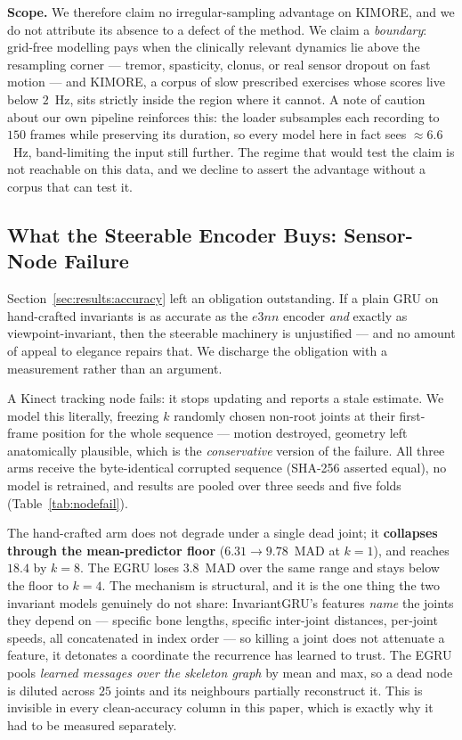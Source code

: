 \textbf{Scope.} We therefore claim no irregular-sampling advantage on KIMORE, and we do not attribute
its absence to a defect of the method. We claim a \emph{boundary}: grid-free modelling pays when the
clinically relevant dynamics lie above the resampling corner --- tremor, spasticity, clonus, or real
sensor dropout on fast motion --- and KIMORE, a corpus of slow prescribed exercises whose scores live
below $2$~Hz, sits strictly inside the region where it cannot. A note of caution about our own
pipeline reinforces this: the loader subsamples each recording to $150$ frames while preserving its
duration, so every model here in fact sees $\approx\!6.6$~Hz, band-limiting the input still further.
The regime that would test the claim is not reachable on this data, and we decline to assert the
advantage without a corpus that can test it.

\subsection{What the Steerable Encoder Buys: Sensor-Node Failure}
\label{sec:results:nodefail}

Section~\ref{sec:results:accuracy} left an obligation outstanding. If a plain GRU on hand-crafted
invariants is as accurate as the $e3nn$ encoder \emph{and} exactly as viewpoint-invariant, then the
steerable machinery is unjustified --- and no amount of appeal to elegance repairs that. We discharge
the obligation with a measurement rather than an argument.

A Kinect tracking node fails: it stops updating and reports a stale estimate. We model this
literally, freezing $k$ randomly chosen non-root joints at their first-frame position for the whole
sequence --- motion destroyed, geometry left anatomically plausible, which is the \emph{conservative}
version of the failure. All three arms receive the byte-identical corrupted sequence (SHA-256 asserted
equal), no model is retrained, and results are pooled over three seeds and five folds
(Table~\ref{tab:nodefail}).

The hand-crafted arm does not degrade under a single dead joint; it \textbf{collapses through the
mean-predictor floor} ($6.31\!\to\!9.78$~MAD at $k=1$), and reaches $18.4$ by $k=8$. The EGRU loses
$3.8$~MAD over the same range and stays below the floor to $k=4$. The mechanism is structural, and it
is the one thing the two invariant models genuinely do not share: InvariantGRU's features
\emph{name} the joints they depend on --- specific bone lengths, specific inter-joint distances,
per-joint speeds, all concatenated in index order --- so killing a joint does not attenuate a feature,
it detonates a coordinate the recurrence has learned to trust. The EGRU pools \emph{learned messages
over the skeleton graph} by mean and max, so a dead node is diluted across $25$ joints and its
neighbours partially reconstruct it. This is invisible in every clean-accuracy column in this paper,
which is exactly why it had to be measured separately.

